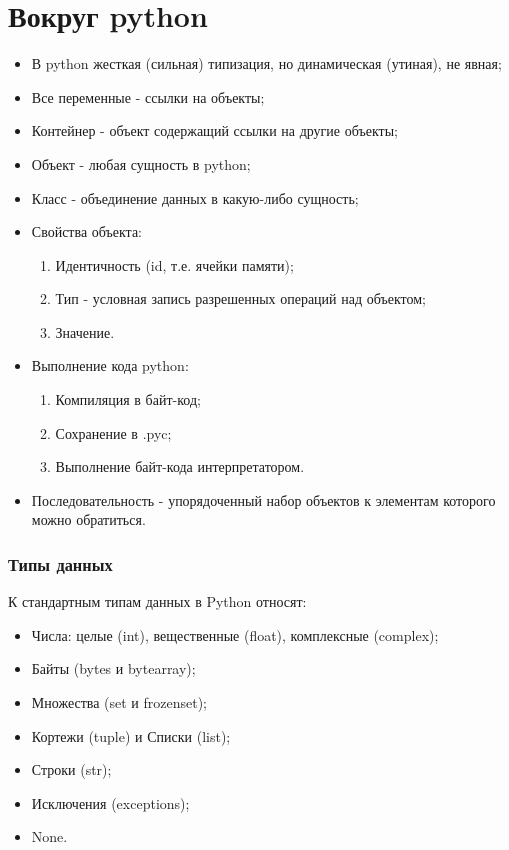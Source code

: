 \part{Вокруг python}

\begin{itemize}
    \item В python жесткая (сильная) типизация, но динамическая (утиная), не явная;
    \item Все переменные - ссылки на объекты;
    \item Контейнер - объект содержащий ссылки на другие объекты;
    \item Объект - любая сущность в python;
    \item Класс - объединение данных в какую-либо сущность;
    \item Свойства объекта:
    \begin{enumerate}
        \item Идентичность (id, т.е. \№ ячейки памяти);
        \item Тип - условная запись разрешенных операций над объектом;
        \item Значение.
    \end{enumerate}
    \item Выполнение кода python:
    \begin{enumerate}
        \item Компиляция в байт-код;
        \item Сохранение в .pyc;
        \item Выполнение байт-кода интерпретатором.
    \end{enumerate}
    \item Последовательность - упорядоченный набор объектов к элементам которого можно обратиться.
\end{itemize}

\section{Типы данных}

	К стандартным типам данных в Python относят:
	\begin{itemize}
		\item Числа: целые (int), вещественные (float), комплексные (complex);
		\item Байты (bytes и bytearray);
		\item Множества (set и frozenset);
		\item Кортежи (tuple) и Списки (list);
		\item Строки (str);
		\item Исключения (exceptions);
		\item None.
	\end{itemize}
	
